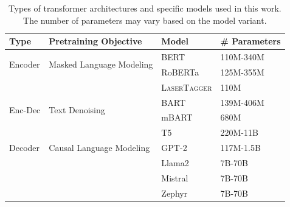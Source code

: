 {\begin{table}[t]
    \footnotesize
    \centering
    \begin{tabular}{lp{4.5cm}ll}
        \toprule
        \textbf{Type}            & \textbf{Pretraining Objective}            & \textbf{Model}                                       & \textbf{\# Parameters} \\
        \midrule
        \multirow{2}{*}{Encoder} & \multirow{2}{*}{Masked Language Modeling} & BERT \cite{devlinBERTPretrainingDeep2019}            & 110M-340M              \\
                                 &                                           & RoBERTa \cite{liuRoBERTaRobustlyOptimized2019}       & 125M-355M              \\
                                 &                                           & \textsc{LaserTagger} \cite{malmi2019lasertagger}     & 110M                   \\
        \midrule
        \multirow{2}{*}{Enc-Dec} & \multirow{2}{*}{Text Denoising}           & BART \cite{lewisBARTDenoisingSequencetoSequence2019} & 139M-406M              \\
                                 &                                           & mBART \cite{liuMultilingualDenoisingPretraining2020} & 680M                   \\
                                 &                                           & T5 \cite{raffelExploringLimitsTransfer2019}          & 220M-11B               \\
        \midrule
        Decoder                  & Causal Language Modeling                  & GPT-2 \cite{radfordLanguageModelsAre2019}            & 117M-1.5B              \\
                                 &                                           & Llama2 \cite{touvronLlamaOpenFoundation2023}         & 7B-70B                 \\
                                 &                                           & Mistral \cite{jiangMistral7B2023}                    & 7B-70B                 \\
                                 &                                           & Zephyr \cite{tunstallZephyrDirectDistillation2023}   & 7B-70B                 \\
        \bottomrule
    \end{tabular}
    \caption{Types of transformer architectures and specific models used in this work. The number of parameters may vary based on the model variant.}
    \label{tab:pretrained_models}
\end{table}


}
